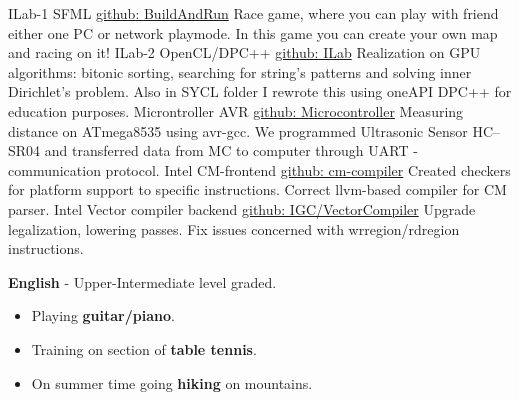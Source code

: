 \documentclass[9pt]{developercv} %
\begin{document}
\begin{entrylist}
	\entry
		{ILab-1}
		{SFML}
		{\href{https://github.com/MarkGoncharovAl/BAR_BuildAndRun_}{github: BuildAndRun}}
		{Race game, where you can play with friend either one PC or network playmode. In this game you can create your own map and racing on it!}
	\entry
		{ILab-2}
		{OpenCL/DPC++}
		{\href{https://github.com/MarkGoncharovAl/ILab}{github: ILab}}
		{Realization on GPU algorithms: bitonic sorting, searching for string's patterns and solving inner Dirichlet's problem. Also in SYCL folder I rewrote this using oneAPI DPC++ for education purposes. }
	\entry
	    {Microntroller}
	    {AVR}
	    {\href{https://github.com/MarkGoncharovAl/MicroController}{github: Microcontroller}}
	    {Measuring distance on ATmega8535 using avr-gcc. We programmed Ultrasonic Sensor HC–SR04 and transferred data from MC to computer through UART - communication protocol.}
	\entry
	    {Intel}
	    {CM-frontend}
	    {\href{https://github.com/intel/cm-compiler}{github: cm-compiler}}
	    {Created checkers for platform support to specific instructions. Correct llvm-based 
	    compiler for CM parser.}
	\entry
	    {Intel}
	    {Vector compiler backend}
	    {\href{https://github.com/intel/intel-graphics-compiler/tree/master/IGC/VectorCompiler}{github: IGC/VectorCompiler}}
	    {Upgrade legalization, lowering passes. Fix issues concerned with wrregion/rdregion instructions.}
\end{entrylist}




\begin{minipage}[t]{0.5\textwidth}
	\vspace{-\baselineskip} %

	
	\textbf{English} - Upper-Intermediate level graded.\\
\end{minipage}
\hfill
\begin{minipage}[t]{0.5\textwidth}
	\vspace{-\baselineskip} %
	
	\begin{itemize}
	    \item Playing \textbf{guitar/piano}.
	    \item Training on section of \textbf{table tennis}.
	    \item On summer time going \textbf{hiking} on mountains.
	\end{itemize}
\end{minipage}
\hfill
\end{document}
